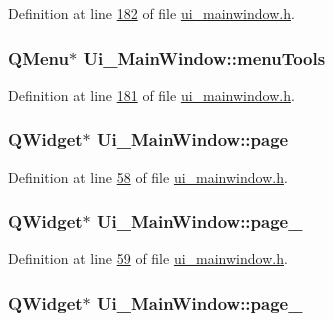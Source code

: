 Definition at line \hyperlink{a00139_source_l00182}{182} of file \hyperlink{a00139_source}{ui\+\_\+mainwindow.\+h}.

\hypertarget{a00080_a552c7b6d729252c2768c9a077679fef7}{
\subsubsection[{menu\+Tools}]{\setlength{\rightskip}{0pt plus 5cm}Q\+Menu$\ast$ Ui\+\_\+\+Main\+Window\+::menu\+Tools}}\label{a00080_a552c7b6d729252c2768c9a077679fef7}


Definition at line \hyperlink{a00139_source_l00181}{181} of file \hyperlink{a00139_source}{ui\+\_\+mainwindow.\+h}.

\hypertarget{a00080_ad7d164376bef8649ee1f94697b859417}{
\subsubsection[{page}]{\setlength{\rightskip}{0pt plus 5cm}Q\+Widget$\ast$ Ui\+\_\+\+Main\+Window\+::page}}\label{a00080_ad7d164376bef8649ee1f94697b859417}


Definition at line \hyperlink{a00139_source_l00058}{58} of file \hyperlink{a00139_source}{ui\+\_\+mainwindow.\+h}.

\hypertarget{a00080_adcb6de4cebc6760fe319711f125010cc}{
\subsubsection[{page\+\_\+2}]{\setlength{\rightskip}{0pt plus 5cm}Q\+Widget$\ast$ Ui\+\_\+\+Main\+Window\+::page\+\_}}\label{a00080_adcb6de4cebc6760fe319711f125010cc}


Definition at line \hyperlink{a00139_source_l00059}{59} of file \hyperlink{a00139_source}{ui\+\_\+mainwindow.\+h}.

\hypertarget{a00080_ac682cb2a9b686ca7c3d29771ad9ccb48}{
\subsubsection[{page\+\_\+3}]{\setlength{\rightskip}{0pt plus 5cm}Q\+Widget$\ast$ Ui\+\_\+\+Main\+Window\+::page\+\_}}\label{a00080_ac682cb2a9b686ca7c3d29771ad9ccb48}


